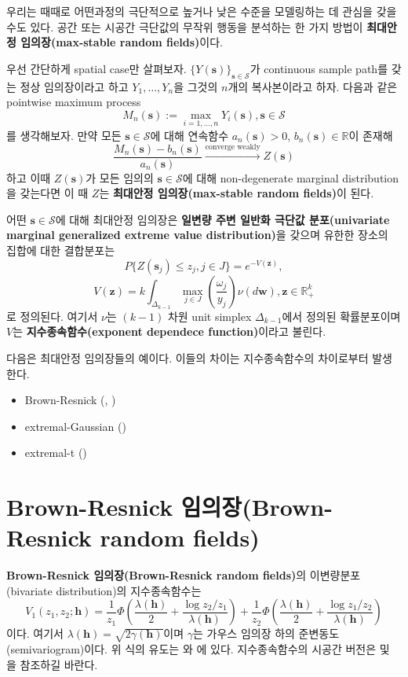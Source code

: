 \documentclass[b5paper,]{scrbook}
\theoremstyle{plain}
\theoremstyle{definition}
\numberwithin{equation}{section}
\begin{document}
우리는 때때로 어떤과정의 극단적으로 높거나 낮은 수준을 모델링하는 데
관심을 갖을 수도 있다. 공간 또는 시공간 극단값의 무작위 행동을 분석하는
한 가지 방법이 \textbf{최대안정 임의장(max-stable random fields)}이다.

우선 간단하게 spatial case만 살펴보자.
\(\{Y(\mathbf{s})\}_{\mathbf{s}\in\mathcal{S}}\)가 continuous sample
path를 갖는 정상 임의장이라고 하고 \(Y_{1},\ldots, Y_{n}\)을 그것의
\(n\)개의 복사본이라고 하자. 다음과 같은 pointwise maximum process
\[M_{n}(\mathbf{s}):=\max_{i=1,\ldots,n}Y_{i}(\mathbf{s}), \mathbf{s}\in\mathcal{S}\]
를 생각해보자. 만약 모든 \(\mathbf{s}\in\mathcal{S}\)에 대해 연속함수
\(a_{n}(\mathbf{s})>0\), \(b_{n}(\mathbf{s})\in\mathbb{R}\)이 존재해
\[\frac{M_{n}(\mathbf{s})-b_{n}(\mathbf{s})}{a_{n}(\mathbf{s})} \stackrel{\text{converge weakly}}{\rightarrow}Z(\mathbf{s})\]
하고 이때 \(Z(\mathbf{s})\)가 모든 임의의 \(\mathbf{s}\in\mathcal{S}\)에
대해 non-degenerate marginal distribution을 갖는다면 이 때 \(Z\)는
\textbf{최대안정 임의장(max-stable random fields)}이 된다.

어떤 \(\mathbf{s}\in\mathcal{S}\)에 대해 최대안정 임의장은
\textbf{일변량 주변 일반화 극단값 분포(univariate marginal generalized
extreme value distribution)}을 갖으며 유한한 장소의 집합에 대한
결합분포는
\[P\{Z(\mathbf{s}_{j})\leq z_{j}, j \in J\}=e^{-V(\mathbf{z})},\]
\[V(\mathbf{z})=k\int_{\Delta_{k-1}}\max_{j\in J}(\frac{\omega_{j}}{y_{j}})\nu(d\mathbf{w}), \mathbf{z}\in\mathbb{R}_{+}^{k}\]
로 정의된다. 여기서 \(\nu\)는 \((k-1)\) 차원 unit simplex
\(\Delta_{k-1}\)에서 정의된 확률분포이며 \(V\)는
\textbf{지수종속함수(exponent dependece function)}이라고 불린다.

다음은 최대안정 임의장들의 예이다. 이들의 차이는 지수종속함수의
차이로부터 발생한다.

\begin{itemize}
\item
  Brown-Resnick (\citep{Kabluchko2009a}, \citep{Kabluchko2011})
\item
  extremal-Gaussian (\citep{Schlather2002})
\item
  extremal-t (\citep{Davison2012})
\end{itemize}

\section{Brown-Resnick 임의장(Brown-Resnick random
fields)}\label{brown-resnick-brown-resnick-random-fields}

\textbf{Brown-Resnick 임의장(Brown-Resnick random fields)}의
이변량분포(bivariate distribution)의 지수종속함수는 \[
V_{1}(z_{1},z_{2};\mathbf{h})=\frac{1}{z_{1}}\Phi (\frac{\lambda(\mathbf{h})}{2}+\frac{\log z_{2}/z_{1}}{\lambda(\mathbf{h})}) + \frac{1}{z_{2}}\Phi (\frac{\lambda(\mathbf{h})}{2}+\frac{\log z_{1}/z_{2}}{\lambda(\mathbf{h})})
\] 이다. 여기서 \(\lambda(\mathbf{h})=\sqrt{2\gamma(\mathbf{h})}\)이며
\(\gamma\)는 가우스 임의장 하의 준변동도(semivariogram)이다. 위 식의
유도는 \citep{Husler1989}와 \citep{Smith1990}에 있다. 지수종속함수의
시공간 버전은 \citep{Kabluchko2009b} 및 \citep{Davis2013}을 참조하길
바란다.
\end{document}
